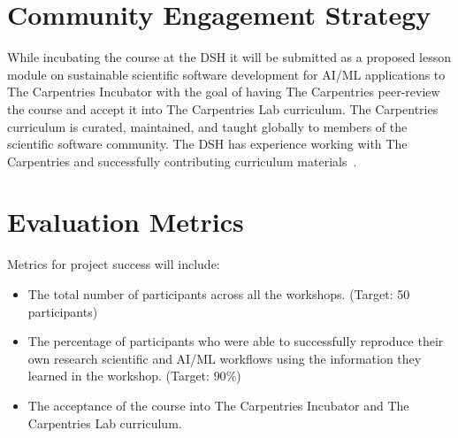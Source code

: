 \documentclass[letterpaper, 11pt]{article}
\begin{document}
\section{Community Engagement Strategy}


While incubating the course at the DSH it will be submitted as a proposed lesson module on sustainable scientific software development for AI/ML applications to The Carpentries Incubator with the goal of having The Carpentries peer-review the course and accept it into The Carpentries Lab curriculum.
The Carpentries curriculum is curated, maintained, and taught globally to members of the scientific software community.
The DSH has experience working with The Carpentries and successfully contributing curriculum materials~\cite{backhaus_2024_14360351}.

\section{Evaluation Metrics}



Metrics for project success will include:
\begin{itemize}[noitemsep]
  \item The total number of participants across all the workshops. (Target: 50 participants)
  \item The percentage of participants who were able to successfully reproduce their own research scientific and AI/ML workflows using the information they learned in the workshop. (Target: $90\%$)
  \item The acceptance of the course into The Carpentries Incubator and The Carpentries Lab curriculum.
\end{itemize}
\end{document}
